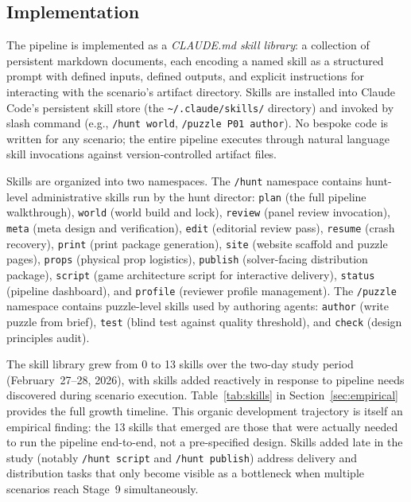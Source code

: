 \subsection{Implementation}
\label{sec:implementation}

The pipeline is implemented as a \emph{CLAUDE.md skill library}: a collection of
persistent markdown documents, each encoding a named skill as a structured prompt with
defined inputs, defined outputs, and explicit instructions for interacting with the
scenario's artifact directory. Skills are installed into Claude Code's persistent skill
store (the \texttt{\textasciitilde{}/.claude/skills/} directory) and invoked by slash
command (e.g., \texttt{/hunt world}, \texttt{/puzzle P01 author}). No bespoke code is
written for any scenario; the entire pipeline executes through natural language skill
invocations against version-controlled artifact files.

Skills are organized into two namespaces. The \texttt{/hunt} namespace contains
hunt-level administrative skills run by the hunt director: \texttt{plan} (the full
pipeline walkthrough), \texttt{world} (world build and lock), \texttt{review} (panel
review invocation), \texttt{meta} (meta design and verification), \texttt{edit}
(editorial review pass), \texttt{resume} (crash recovery), \texttt{print} (print package
generation), \texttt{site} (website scaffold and puzzle pages), \texttt{props} (physical
prop logistics), \texttt{publish} (solver-facing distribution package), \texttt{script}
(game architecture script for interactive delivery), \texttt{status} (pipeline
dashboard), and \texttt{profile} (reviewer profile management). The \texttt{/puzzle}
namespace contains puzzle-level skills used by authoring agents: \texttt{author}
(write puzzle from brief), \texttt{test} (blind test against quality threshold), and
\texttt{check} (design principles audit).

The skill library grew from 0 to 13 skills over the two-day study period (February~27--28,
2026), with skills added reactively in response to pipeline needs discovered during
scenario execution. Table~\ref{tab:skills} in Section~\ref{sec:empirical} provides the
full growth timeline. This organic development trajectory is itself an empirical finding:
the 13 skills that emerged are those that were actually needed to run the pipeline end-to-end,
not a pre-specified design. Skills added late in the study (notably \texttt{/hunt script}
and \texttt{/hunt publish}) address delivery and distribution tasks that only become
visible as a bottleneck when multiple scenarios reach Stage~9 simultaneously.

